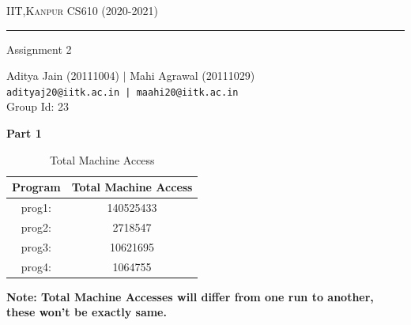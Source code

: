 \documentclass[12pt,oneside,reqno]{amsart}
\begin{document}
{\scshape IIT,Kanpur} \hfill  \hfill {\scshape  CS610 (2020-2021)}
 \thispagestyle{empty}

\smallskip

\hrule
\bigskip

    \begin{center}
		\begin{LARGE}
	      Assignment 2\\[5pt]
		\end{LARGE}
	Aditya Jain (20111004) $\mid$ Mahi Agrawal (20111029)\\

\texttt{adityaj20@iitk.ac.in | maahi20@iitk.ac.in}\\Group Id: 23

	\end{center}

  \bigskip

\begin{LARGE}
		\textbf{Part 1}
	\end{LARGE}

 \begin{table}[h]
     \centering
     \begin{tabular}{|c|c|}
        \hline
        Program     &  Total Machine Access\\
        \hline
        \hline
         prog1:&  140525433   \\
         prog2:& 2718547\\
         prog3:& 10621695\\
         prog4:& 1064755\\

\hline
     \end{tabular}
     \caption{Total Machine Access}
     \label{tab:Total Machine Access}
 \end{table}
 \textbf{Note: Total Machine Accesses will differ from one run to another, these won't be exactly same.}\\\\
\end{document}
